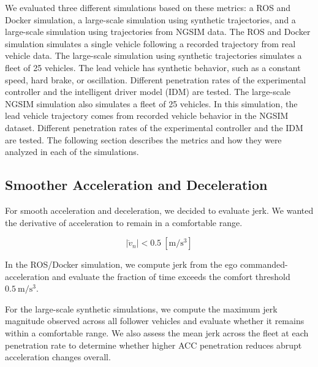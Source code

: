 \documentclass[conference]{IEEEtran}
\newcommand{\kibitz}[2]{\ifnum\Comments=1\textcolor{#1}{#2}\fi}
\newcommand{\jms}[1]{\kibitz{darkgreen}      {[JMS: #1]}}
\begin{document}
We evaluated three different simulations based on these metrics: a ROS and Docker simulation, a large-scale simulation using synthetic trajectories, and a large-scale simulation using trajectories from NGSIM \cite{FHWA_NGSIM_2006, ngsim_us101} data. The ROS and Docker simulation simulates a single vehicle following a recorded trajectory from real vehicle data. The large-scale simulation using synthetic trajectories simulates a fleet of 25 vehicles. The lead vehicle has synthetic behavior, such as a constant speed, hard brake, or oscillation. Different penetration rates of the experimental controller and the intelligent driver model (IDM) \cite{PhysRevE.62.1805} are tested. The large-scale NGSIM simulation also simulates a fleet of 25 vehicles. In this simulation, the lead vehicle trajectory comes from recorded vehicle behavior in the NGSIM dataset. Different penetration rates of the experimental controller and the IDM are tested. The following section describes the metrics and how they were analyzed in each of the simulations.

\subsection{Smoother Acceleration and Deceleration}

For smooth acceleration and deceleration, we decided to evaluate jerk. We wanted the derivative of acceleration to remain in a comfortable range. %

\begin{equation}
    \left| \ddot{v}_n \right| < 0.5~\mathrm{[m/s^3]}
\end{equation}




In the ROS/Docker simulation, we compute jerk from the ego commanded-acceleration and evaluate the fraction of time exceeds the comfort threshold \(0.5~\mathrm{m/s^3}\).


For the large-scale synthetic simulations, we compute the maximum jerk magnitude observed across all follower vehicles and evaluate whether it remains within a comfortable range. We also assess the mean jerk across the fleet at each penetration rate to determine whether higher ACC penetration reduces abrupt acceleration changes overall.
\end{document}
